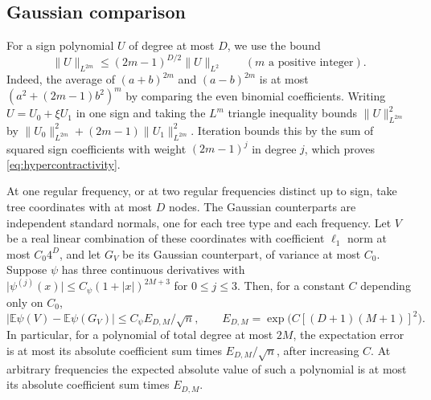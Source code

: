 \documentclass[preprints,article,submit,oneauthor]{Definitions/mdpi}
\newcommand{\E}{\mathbb E}
\newcommand{\abs}[1]{\lvert #1\rvert}
\newcommand{\norm}[1]{\lVert #1\rVert}
\begin{document}
\subsection{Gaussian comparison}

For a sign polynomial \(U\) of degree at most \(D\), we use the bound
\begin{equation}\label{eq:hypercontractivity}
 \norm U_{L^{2m}}\le (2m-1)^{D/2}\norm U_{L^2}
 \qquad(m\text{ a positive integer}).
\end{equation}
Indeed, the average of \((a+b)^{2m}\) and \((a-b)^{2m}\) is at most
\((a^2+(2m-1)b^2)^m\) by comparing the even binomial coefficients.
Writing \(U=U_0+\xi U_1\) in one sign and taking the \(L^m\) triangle
inequality bounds \(\norm U_{L^{2m}}^2\) by
\(\norm{U_0}_{L^{2m}}^2+(2m-1)\norm{U_1}_{L^{2m}}^2\).
Iteration bounds this by the sum of squared sign coefficients with
weight \((2m-1)^j\) in degree \(j\), which proves
\eqref{eq:hypercontractivity}.

\begin{Lemma}\label{lem:comparison}
At one regular frequency, or at two regular frequencies distinct up
to sign, take tree coordinates with at most \(D\) nodes. The Gaussian
counterparts are independent standard normals, one for each tree type
and each frequency. Let \(V\) be a real linear combination of these
coordinates with coefficient \(\ell_1\) norm at most \(C_0 4^D\), and
let \(G_V\) be its Gaussian counterpart, of variance at most \(C_0\).
Suppose \(\psi\) has three continuous derivatives with
\(\abs{\psi^{(j)}(x)}\le C_\psi(1+\abs x)^{2M+3}\) for \(0\le j\le3\).
Then, for a constant \(C\) depending only on \(C_0\),
\begin{equation}\label{eq:comparison}
 \abs{\E \psi(V)-\E \psi(G_V)}\le C_\psi E_{D,M}/\sqrt n,
 \qquad E_{D,M}=\exp\!\bigl(C[(D+1)(M+1)]^2\bigr).
\end{equation}
In particular, for a polynomial of total degree at most \(2M\), the
expectation error is at most its absolute coefficient sum times
\(E_{D,M}/\sqrt n\), after increasing \(C\). At arbitrary frequencies
the expected absolute value of such a polynomial is at most its
absolute coefficient sum times \(E_{D,M}\).
\end{Lemma}
\end{document}
